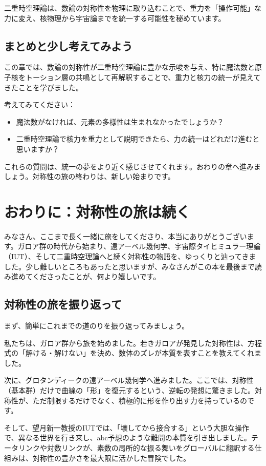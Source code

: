 \documentclass[dvipdfmx,12pt,a4paper]{jsarticle}
\begin{document}
二重時空理論は、数論の対称性を物理に取り込むことで、重力を「操作可能」な力に変え、核物理から宇宙論までを統一する可能性を秘めています。

\subsection{まとめと少し考えてみよう}

この章では、数論の対称性が二重時空理論に豊かな示唆を与え、特に魔法数と原子核をトーション層の共鳴として再解釈することで、重力と核力の統一が見えてきたことを学びました。

考えてみてください：
\begin{itemize}
  \item 魔法数がなければ、元素の多様性は生まれなかったでしょうか？
  \item 二重時空理論で核力を重力として説明できたら、力の統一はどれだけ進むと思いますか？
\end{itemize}

これらの質問は、統一の夢をより近く感じさせてくれます。おわりの章へ進みましょう。対称性の旅の終わりは、新しい始まりです。

\section{おわりに：対称性の旅は続く}

みなさん、ここまで長く一緒に旅をしてくださり、本当にありがとうございます。ガロア群の時代から始まり、遠アーベル幾何学、宇宙際タイヒミュラー理論（IUT）、そして二重時空理論へと続く対称性の物語を、ゆっくりと辿ってきました。少し難しいところもあったと思いますが、みなさんがこの本を最後まで読み進めてくださったことが、何より嬉しいです。

\subsection{対称性の旅を振り返って}

まず、簡単にこれまでの道のりを振り返ってみましょう。

私たちは、ガロア群から旅を始めました。若きガロアが発見した対称性は、方程式の「解ける・解けない」を決め、数体のズレが本質を表すことを教えてくれました。

次に、グロタンディークの遠アーベル幾何学へ進みました。ここでは、対称性（基本群）だけで曲線の「形」を復元するという、逆転の発想に驚きました。対称性が、ただ制限するだけでなく、積極的に形を作り出す力を持っているのです。

そして、望月新一教授のIUTでは、「壊してから接合する」という大胆な操作で、異なる世界を行き来し、abc予想のような難問の本質を引き出しました。テータリンクや対数リンクが、素数の局所的な振る舞いをグローバルに翻訳する仕組みは、対称性の豊かさを最大限に活かした冒険でした。
\end{document}
